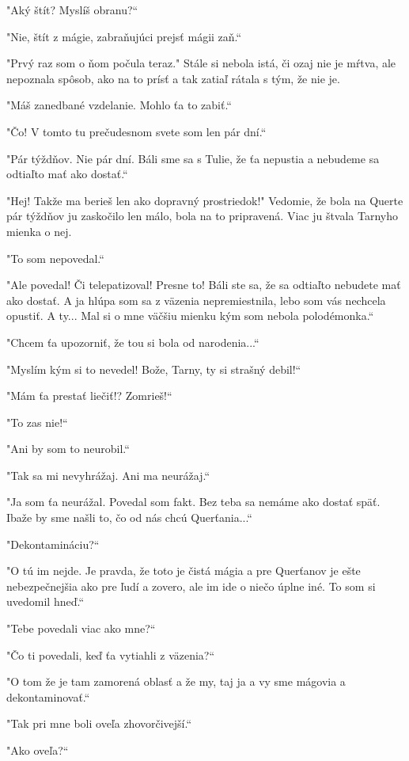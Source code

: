\documentclass{book}
\begin{document}
"$ $Aký štít? Myslíš obranu?“

"$ $Nie, štít z mágie, zabraňujúci prejsť mágii zaň.“

"$ $Prvý raz som o ňom počula teraz."$ $ Stále si nebola istá, či ozaj nie je mŕtva, ale nepoznala spôsob, ako na to prísť a tak zatiaľ rátala s tým, že nie je.

"$ $Máš zanedbané vzdelanie. Mohlo ťa to zabiť.“

"$ $Čo! V tomto tu prečudesnom svete som len pár dní.“

"$ $Pár týždňov. Nie pár dní. Báli sme sa s Tulie, že ťa nepustia a nebudeme sa odtiaľto mať ako dostať.“

"$ $Hej! Takže ma berieš len ako dopravný prostriedok!"$ $ Vedomie, že bola na Querte pár týždňov ju zaskočilo len málo, bola na to pripravená. Viac ju štvala Tarnyho mienka o nej.

"$ $To som nepovedal.“

"$ $Ale povedal! Či telepatizoval! Presne to! Báli ste sa, že sa odtiaľto nebudete mať ako dostať. A ja hlúpa som sa z väzenia nepremiestnila, lebo som vás nechcela opustiť. A ty... Mal si o mne väčšiu mienku kým som nebola polodémonka.“

"$ $Chcem ťa upozorniť, že tou si bola od narodenia...“

"$ $Myslím kým si to nevedel! Bože, Tarny, ty si strašný debil!“

"$ $Mám ťa prestať liečiť!? Zomrieš!“

"$ $To zas nie!“

"$ $Ani by som to neurobil.“

"$ $Tak sa mi nevyhrážaj. Ani ma neurážaj.“

"$ $Ja som ťa neurážal. Povedal som fakt. Bez teba sa nemáme ako dostať späť. Ibaže by sme našli to, čo od nás chcú Querťania...“

"$ $Dekontamináciu?“

"$ $O tú im nejde. Je pravda, že toto je čistá mágia a pre Querťanov je ešte nebezpečnejšia ako pre ľudí a zovero, ale im ide o niečo úplne iné. To som si uvedomil hneď.“

"$ $Tebe povedali viac ako mne?“

"$ $Čo ti povedali, keď ťa vytiahli z väzenia?“

"$ $O tom že je tam zamorená oblasť a že my, taj ja a vy sme mágovia a dekontaminovať.“

"$ $Tak pri mne boli oveľa zhovorčivejší.“

"$ $Ako oveľa?“
\end{document}
